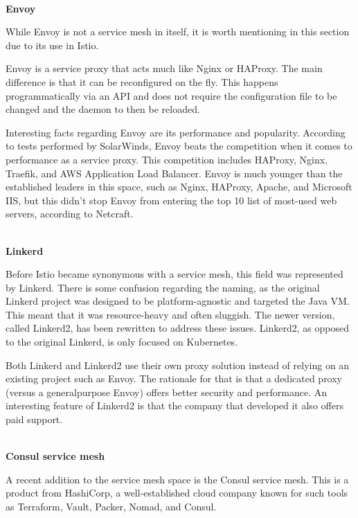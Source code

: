 \hspace*{\fill} \\ %
\noindent
\textbf{Envoy}

While Envoy is not a service mesh in itself, it is worth mentioning in this section due to its use in Istio.

Envoy is a service proxy that acts much like Nginx or HAProxy. The main difference is that it can be reconfigured on the fly. This happens programmatically via an API and does not require the configuration file to be changed and the daemon to then be reloaded.

Interesting facts regarding Envoy are its performance and popularity. According to tests performed by SolarWinds, Envoy beats the competition when it comes to performance as a service proxy. This competition includes HAProxy, Nginx, Traefik, and AWS Application Load Balancer. Envoy is much younger than the established leaders in this space, such as Nginx, HAProxy, Apache, and Microsoft IIS, but this didn't stop Envoy from entering the top 10 list of most-used web servers, according to Netcraft.

\hspace*{\fill} \\ %
\noindent
\textbf{Linkerd}

Before Istio became synonymous with a service mesh, this field was represented by Linkerd. There is some confusion regarding the naming, as the original Linkerd project was designed to be platform-agnostic and targeted the Java VM. This meant that it was resource-heavy and often sluggish. The newer version, called Linkerd2, has been rewritten to address these issues. Linkerd2, as opposed to the original Linkerd, is only focused on Kubernetes.

Both Linkerd and Linkerd2 use their own proxy solution instead of relying on an existing project such as Envoy. The rationale for that is that a dedicated proxy (versus a generalpurpose Envoy) offers better security and performance. An interesting feature of Linkerd2 is that the company that developed it also offers paid support.

\hspace*{\fill} \\ %
\noindent
\textbf{Consul service mesh}

A recent addition to the service mesh space is the Consul service mesh. This is a product from HashiCorp, a well-established cloud company known for such tools as Terraform, Vault, Packer, Nomad, and Consul.

